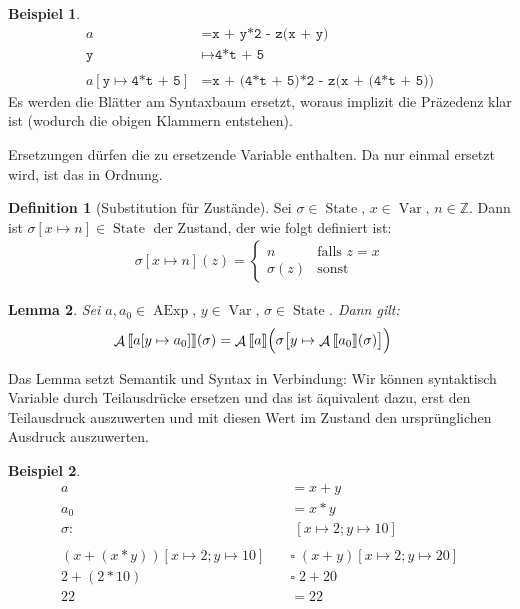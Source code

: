 \documentclass[a4paper,12pt]{article}
\theoremstyle{definition}
\newtheorem*{example}{Beispiel}
\newtheorem{definition}{Definition}[section]
\theoremstyle{plain}
\newtheorem{lemma}[definition]{Lemma}
\theoremstyle{remark}
\newcommand{\lsem}{\mathrm{[}\kern-.14em\mathrm{[}}
\newcommand{\rsem}{\mathrm{]}\kern-.14em\mathrm{]}}
\DeclareMathOperator{\AExp}{AExp}
\DeclareMathOperator{\Var}{Var}
\DeclareMathOperator{\State}{State}
\DeclareMathOperator{\A}{\mathcal{A}}
\begin{document}
\begin{example}
    \begin{align*}
        a & = \texttt{x + y*2 - z(x + y)} \\
        \texttt{y} & \mapsto \texttt{4*t + 5} \\
        \\
        a[\texttt{y} \mapsto \texttt{4*t + 5}] & = \texttt{x + (4*t + 5)*2 - z(x + (4*t + 5))}
    \end{align*}
    Es werden die Blätter am Syntaxbaum ersetzt, woraus implizit die Präzedenz klar ist (wodurch die obigen Klammern entstehen).

    Ersetzungen dürfen die zu ersetzende Variable enthalten. Da nur einmal ersetzt wird, ist das in Ordnung.
\end{example}

\begin{definition}[Substitution für Zustände] \label{def:substitutionState}
    Sei $\sigma \in \State, \, x \in \Var, \, n \in \mathbb{Z}$. Dann ist $\sigma[x \mapsto n] \in \State$ der Zustand, der wie folgt definiert ist:
    \begin{align*}
        \sigma[x \mapsto n](z) = \begin{cases}
            n & \text{falls } z = x \\
            \sigma(z) & \text{sonst}
        \end{cases}
    \end{align*}
\end{definition}

\begin{lemma}
    Sei $a, a_0 \in \AExp, \, y \in \Var, \, \sigma \in \State$. Dann gilt:
    \begin{align*}
        \A\lsem a[y \mapsto a_0] \rsem(\sigma) & = \A\lsem a \rsem \Big( \sigma\big[y \mapsto \A\lsem a_0 \rsem(\sigma)\big] \Big)
    \end{align*}
\end{lemma}

Das Lemma setzt Semantik und Syntax in Verbindung: Wir können syntaktisch Variable durch Teilausdrücke ersetzen und das ist äquivalent dazu, erst den Teilausdruck auszuwerten und mit diesen Wert im Zustand den ursprünglichen Ausdruck auszuwerten.

\begin{example}
    \begin{align*}
    a & = x + y \\
    a_0 & = x * y \\
    \sigma: & \; [x \mapsto 2; y \mapsto 10] \\
    \\
    (x + (x * y))[x \mapsto 2; y \mapsto 10] \quad & \square\; (x + y)[x \mapsto 2; y \mapsto 20] \\
    2 + (2 * 10) \quad & \square\; 2 + 20 \\
    22 \quad & = 22
\end{align*}
\end{example}
\end{document}
